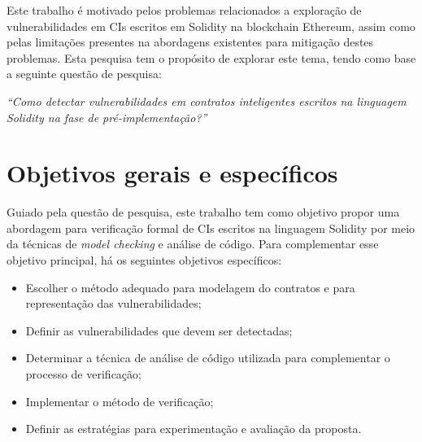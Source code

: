 Este trabalho é motivado pelos problemas relacionados a exploração de vulnerabilidades em CIs escritos em Solidity na blockchain Ethereum, assim como pelas limitações presentes na abordagens existentes para mitigação destes problemas. Esta pesquisa tem o propósito de explorar este tema, tendo como base a seguinte questão de pesquisa:

\textit{``Como detectar vulnerabilidades em contratos inteligentes escritos na linguagem Solidity na fase de pré-implementação?''}






\section{Objetivos gerais e específicos}

Guiado pela questão de pesquisa, este trabalho tem como objetivo propor uma abordagem para verificação formal de CIs escritos na linguagem Solidity por meio da técnicas de \textit{model checking} e análise de código. Para complementar esse objetivo principal, há os seguintes objetivos específicos:
\begin{itemize}
    \item Escolher o método adequado para modelagem do contratos e para representação das vulnerabilidades;
    \item Definir as vulnerabilidades que devem ser detectadas;
    \item Determinar a técnica de análise de código utilizada para complementar o processo de verificação;
    \item Implementar o método de verificação;
    \item Definir as estratégias para experimentação e avaliação da proposta.
\end{itemize}

